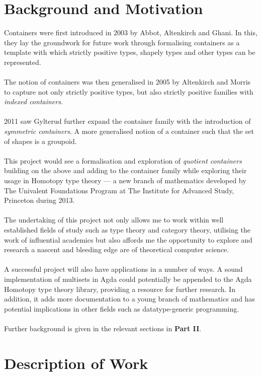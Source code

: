 \documentclass[12pt]{report}
\begin{document}
\section{Background and Motivation}
Containers were first introduced in 2003 by Abbot, Altenkirch and Ghani\cite{coc}. In this, they lay the groundwork for future work through formalising containers as a template with which strictly positive types, shapely types and other types can be represented.\\
\\
The notion of containers was then generalised in 2005 by Altenkirch and Morris\cite{icont} to capture not only strictly positive types, but also strictly positive families with \textit{indexed containers}.\\
\\
2011 saw Gylterud\cite{hott3} further expand the container family with the introduction of \textit{symmetric containers}. A more generalised notion of a container such that the set of shapes is a groupoid.\\
\\
This project would see a formalisation and exploration of \textit{quotient containers} building on the above and adding to the container family while exploring their usage in Homotopy type theory --- a new branch of mathematics developed by The Univalent Foundations Program at The Institute for Advanced Study, Princeton during 2013.\\
\\
The undertaking of this project not only allows me to work within well established fields of study such as type theory and category theory, utilising the work of influential academics but also affords me the opportunity to explore and research a nascent and bleeding edge are of theoretical computer science.\\
\\
A successful project will also have applications in a number of ways. A sound implementation of multisets in Agda could potentially be appended to the Agda Homotopy type theory library, providing a resource for further research. In addition, it adds more documentation to a young branch of mathematics and has potential implications in other fields such as datatype-generic programming.\\
\\
Further background is given in the relevant sections in \textbf{Part II}.


\section{Description of Work}
\end{document}
